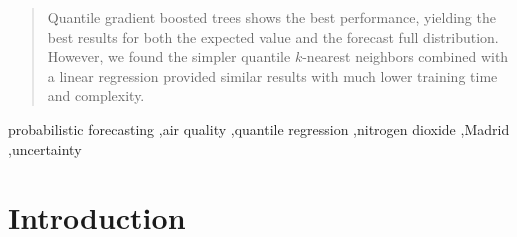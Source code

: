 \documentclass[a4paper,3p,sort&compress]{elsarticle}
\begin{document}
\begin{frontmatter}
\begin{abstract}
Quantile gradient boosted
trees shows the best performance, yielding the best results for both the
expected value and the forecast full distribution. However, we found 
the simpler quantile $k$-nearest neighbors 
combined with a linear regression provided similar results with much lower training time and complexity.



\end{abstract}

\begin{keyword}
probabilistic forecasting \sep air quality \sep quantile regression
\sep nitrogen dioxide \sep Madrid \sep uncertainty 
\end{keyword}

\end{frontmatter}


\section{Introduction }
\label{sec:intro}
\end{document}
